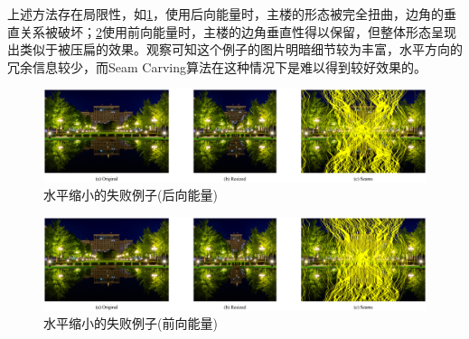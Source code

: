 \documentclass[twoside,a4paper,4pt]{article}
\begin{document}
上述方法存在局限性，如\cref{fig:narrow_fail_bw}，使用后向能量时，主楼的形态被完全扭曲，边角的垂直关系被破坏；\cref{fig:narrow_fail_fw}使用前向能量时，主楼的边角垂直性得以保留，但整体形态呈现出类似于被压扁的效果。观察可知这个例子的图片明暗细节较为丰富，水平方向的冗余信息较少，而Seam Carving算法在这种情况下是难以得到较好效果的。
\begin{figure}[H]
    \centering
    \includegraphics[width=\linewidth]{demo/output/mbuilding.png}
    \vspace{-30pt}\caption{水平缩小的失败例子(后向能量)}
    \label{fig:narrow_fail_bw}
\end{figure}\par
\begin{figure}[H]
    \centering
    \includegraphics[width=\linewidth]{demo/output/mbuilding_forward.png}
    \vspace{-30pt}\caption{水平缩小的失败例子(前向能量)}
    \label{fig:narrow_fail_fw}
\end{figure}\par
\end{document}
